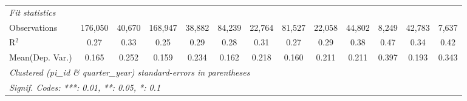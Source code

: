 \begin{tabular}{lcccccccccccc}
   \midrule
   \emph{Fit statistics}\\
   Observations                                               & 176,050        & 40,670        & 168,947        & 38,882        & 84,239         & 22,764         & 81,527         & 22,058         & 44,802         & 8,249         & 42,783        & 7,637\\  
   R$^2$                                                      & 0.27           & 0.33          & 0.25           & 0.29          & 0.28           & 0.31           & 0.27           & 0.29           & 0.38           & 0.47          & 0.34          & 0.42\\  
Mean(Dep. Var.) & 0.165 & 0.252 & 0.159 & 0.234 & 0.162 & 0.218 & 0.160 & 0.211 & 0.211 & 0.397 & 0.193 & 0.343 \\
   \midrule \midrule
   \multicolumn{13}{l}{\emph{Clustered (pi\_id \& quarter\_year) standard-errors in parentheses}}\\
   \multicolumn{13}{l}{\emph{Signif. Codes: ***: 0.01, **: 0.05, *: 0.1}}\\
\end{tabular}
\par\endgroup
